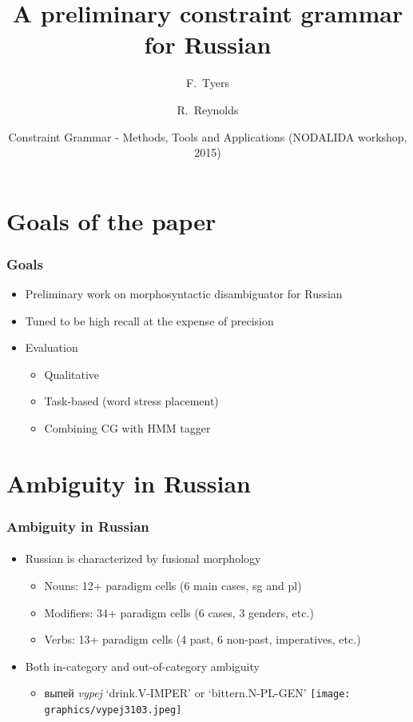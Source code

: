 \documentclass{beamer}
\title[A preliminary constraint grammar for Russian] %
{A preliminary constraint grammar for Russian}
\author[Tyers, Reynolds] %
{F.~Tyers \and R.~Reynolds}
\institute[UiT, The Arctic University of Norway] %
{
  Department of Languages and Linguistics\\
  UiT, The Arctic University of Norway
}
\date[NODALIDA-CG 2015] %
{Constraint Grammar - Methods, Tools and Applications (NODALIDA workshop, 2015)}
\newcommand{\rus}[1]{\foreignlanguage{russian}{#1}}
\begin{document}
\frame{\titlepage}
 
\section{Goals of the paper}

\begin{frame}
\frametitle{Goals}
\begin{itemize}
	\item Preliminary work on morphosyntactic disambiguator for Russian
	\pause
	\item Tuned to be high recall at the expense of precision
	\pause
	\item Evaluation
	\begin{itemize}
		\item Qualitative
		\item Task-based (word stress placement)
		\item Combining CG with HMM tagger
	\end{itemize}
\end{itemize}
\end{frame}

\section{Ambiguity in Russian} %

\begin{frame}
\frametitle{Ambiguity in Russian}
\framesubtitle{}
\begin{itemize}
	\item Russian is characterized by fusional morphology
	\begin{itemize}
		\item Nouns: 12+ paradigm cells (6 main cases, sg and pl)
		\item Modifiers: 34+ paradigm cells (6 cases, 3 genders, etc.)
		\item Verbs: 13+ paradigm cells (4 past, 6 non-past, imperatives, etc.)
	\end{itemize}
	\pause
	\item Both in-category and out-of-category ambiguity
	\begin{itemize}
		\item \rus{выпей} \emph{vypej} `drink.V-IMPER' or `bittern.N-PL-GEN'
		\texttt{[image: graphics/vypej3103.jpeg]} %
	\end{itemize}
\end{itemize}
\end{frame}
\end{document}
